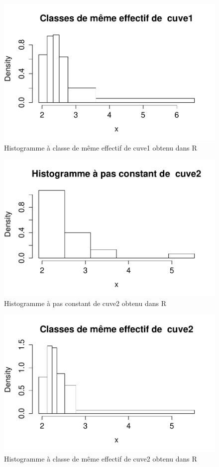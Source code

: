 \documentclass[a4paper,11pt]{article}
\begin{document}
\begin{enumerate}
\begin{figure}[t]
\centering
\includegraphics[width=1.0\textwidth]{figures/histoeff_cuve1.pdf}
\caption{Histogramme à classe de même effectif de cuve1 obtenu dans R}
\end{figure}

\begin{figure}[t]
\centering
\includegraphics[width=1.0\textwidth]{figures/histopas_cuve2.pdf}
\caption{Histogramme à pas constant de cuve2 obtenu dans R}
\end{figure}

\begin{figure}[t]
\centering
\includegraphics[width=1.0\textwidth]{figures/histoeff_cuve2.pdf}
\caption{Histogramme à classe de même effectif de cuve2 obtenu dans R}
\end{figure}


\end{enumerate}
\end{document}
